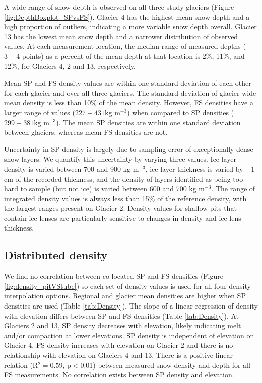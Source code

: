 \documentclass[twocolumn, letterpaper]{igs}
\begin{document}
A wide range of snow depth is observed on all three study glaciers (Figure \ref{fig:DepthBoxplot_SPvsFS}). Glacier 4 has the highest mean snow depth and a high proportion of outliers, indicating a more variable snow depth overall. Glacier 13 has the lowest mean snow depth and a narrower distribution of observed values. At each measurement location, the median range of measured depths ($3-4$ points) as a percent of the mean depth at that location is 2\%, 11\%, and 12\%, for Glaciers 4, 2 and 13, respectively. 

Mean SP and FS density values are within one standard deviation of each other for each glacier and over all three glaciers. The standard deviation of glacier-wide mean density is less than 10\% of the mean density. However, FS densities have a larger range of values ($227-431$kg m$^{-3}$) when compared to SP densities ($299-381$kg m$^{-3}$).  The mean SP densities are within one standard deviation between glaciers, whereas mean FS densities are not.

Uncertainty in SP density is largely due to sampling error of exceptionally dense snow layers. We quantify this uncertainty by varying three values. Ice layer density is varied between 700 and 900 kg m$^{-3}$, ice layer thickness is varied by $\pm$1 cm of the recorded thickness, and the density of layers identified as being too hard to sample (but not ice) is varied between 600 and 700 kg m$^{-3}$. The range of integrated density values is always less than 15\% of the reference density, with the largest ranges present on Glacier 2. Density values for shallow pits that contain ice lenses are particularly sensitive to changes in density and ice lens thickness.

\subsection{Distributed density}

We find no correlation between co-located SP and FS densities (Figure \ref{fig:density_pitVStube}) so each set of density values is used for all four density interpolation options. Regional and glacier mean densities are higher when SP densities are used (Table \ref{tab:Density}). The slope of a linear regression of density with elevation differs between SP and FS densities (Table \ref{tab:Density}). At Glaciers 2 and 13, SP density decreases with elevation, likely indicating melt and/or compaction at lower elevations. SP density is independent of elevation on Glacier 4. FS density increases with elevation on Glacier 2 and there is no relationship with elevation on Glaciers 4 and 13. There is a positive linear relation (R$^2= 0.59$, p$<$0.01) between measured snow density and depth for all FS measurements. No correlation exists between SP density and elevation.
\end{document}

